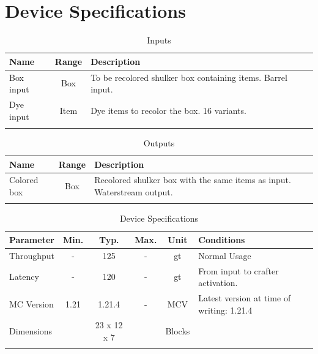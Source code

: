 \documentclass[10pt]{datasheet}
\begin{document}
\onecolumn

\section{Device Specifications}

\begin{table}[H]
    \caption{Inputs}
    \begin{tabularx}{\textwidth}{l | c | X}
        \thickhline
        \textbf{Name} & \textbf{Range} & \textbf{Description} \\
        \hline
        Box input & Box & To be recolored shulker box containing 
        items. Barrel input. \\
        \hline
        Dye input & Item & Dye items to recolor the box. 16 variants. \\
        \thickhline
\end{tabularx}
\end{table}

\begin{table}[H]
    \caption{Outputs}
    \begin{tabularx}{\textwidth}{l | c | X}
        \thickhline
        \textbf{Name} & \textbf{Range} & \textbf{Description} \\
        \hline
        Colored box & Box & Recolored shulker box with the same items as input. Waterstream output. \\
        \thickhline
\end{tabularx}
\end{table}

\begin{table}[H]
    \caption{Device Specifications}
    \begin{tabularx}{\textwidth}{l | c c c | c | X}
        \thickhline
        \textbf{Parameter} & \textbf{Min.} & \textbf{Typ.} & \textbf{Max.} &
        \textbf{Unit} & \textbf{Conditions} \\
        \hline
        Throughput  & - & 125 & - & gt & Normal Usage \\
        \hline
        Latency    & - & 120 & - & gt & From input to crafter activation. \\
        \hline
        MC Version & 1.21 & 1.21.4 & - & MCV & Latest version at time of writing: 1.21.4\\
        \hline
        Dimensions & & 23 x 12 x 7 & & Blocks & \\
        \thickhline
\end{tabularx}
\end{table}
\end{document}
